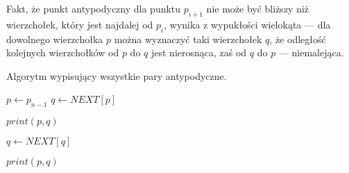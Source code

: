 
Fakt, że punkt antypodyczny dla punktu $p_{i+1}$ nie może być bliższy
niż wierzchołek, który jest najdalej od $p_i$, wynika z wypukłości
wielokąta --- dla dowolnego wierzchołka $p$ można wyznaczyć taki
wierzchołek $q$, że odległość kolejnych wierzchołków od $p$ do $q$
jest nierosnąca, zaś od $q$ do $p$ --- niemalejąca.


\begin{algorithm}
  \caption{Algorytm wypisujący wszystkie pary
    antypodyczne.\label{alg:antipodal}}
  \begin{algorithmic}[1]

    \State $p \gets p_{n-1}$
    \State $q \gets NEXT[p]$

    \State


        \State


        \State


                \State $print (p, q)$

                \State

                        \State $q \gets NEXT[q]$

                        \State

                                \State $print (p, q)$
                        \EndIf
                \EndWhile
         \EndWhile
     \EndWhile
\EndProcedure

  \end{algorithmic}
\end{algorithm}

